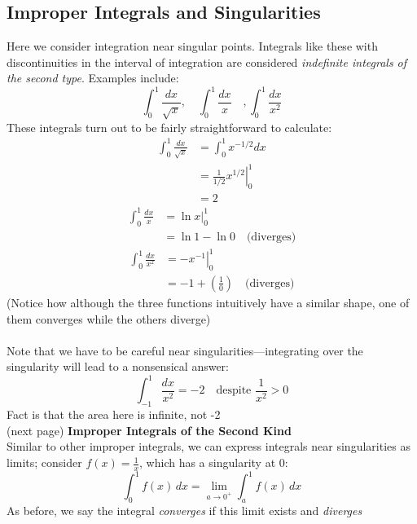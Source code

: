 \documentclass{report}
\begin{document}
\subsection{Improper Integrals and Singularities} %
Here we consider integration near singular points. Integrals like these with discontinuities 
in the interval of integration are considered \textit{indefinite integrals of the second type}.
Examples include:
\begin{equation*}
\int_0^1\frac{dx}{\sqrt{x}},\quad\int_0^1\frac{dx}{x}\quad,
\int_0^1\frac{dx}{x^2}
\end{equation*}
These integrals turn out to be fairly straightforward to calculate:
\begin{align*}
\int_0^1\frac{dx}{\sqrt{x}}&=\int_0^1x^{-1/2}dx\\
&=\left.\frac{1}{1/2}x^{1/2}\right|_0^1\\
&=2
\end{align*}
\begin{align*}
\int_0^1\frac{dx}{x}&=\left.\ln x\right|_0^1\\
&=\ln1-\ln0\quad\text{(diverges)}
\end{align*}
\begin{align*}
\int_0^1\frac{dx}{x^2}&=\left.-x^{-1}\right|_0^1\\
&=-1+\left(\frac{1}{0}\right)\quad\text{(diverges)}
\end{align*}
(Notice how although the three functions intuitively have a similar shape, one of them 
converges while the others diverge)\\
\vspace{1mm}\\
Note that we have to be careful near singularities---integrating over the singularity will
lead to a nonsensical answer:
\begin{equation*}
\int_{-1}^1\frac{dx}{x^2}=-2\quad\text{despite }\frac{1}{x^2}>0
\end{equation*}
Fact is that the area here is infinite, not -2\\
(next page)
\newpage
\noindent\textbf{Improper Integrals of the Second Kind}\\
Similar to other improper integrals, we can express integrals near singularities as limits; 
consider $f(x)=\frac{1}{x}$, which has a singularity at 0:
\begin{equation*}
\int_0^1f(x)\,dx=\lim_{a\to0^+}\int_a^1f(x)\,dx
\end{equation*}
As before, we say the integral \textit{converges} if this limit exists and \textit{diverges} 
\end{document}
